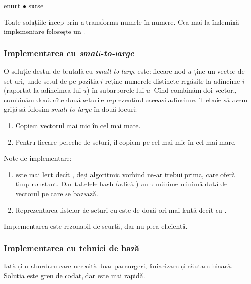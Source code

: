 \documentclass[../main.tex]{subfiles}
\begin{document}
\href{https://codeforces.com/contest/246/problem/E}{enunț}
$\bullet$
\hyperref[code:blood-cousins-return]{surse}

Toate soluțiile încep prin a transforma numele în numere. Cea mai la îndemînă implementare folosește un .

\subsubsection*{Implementarea cu \textit{small-to-large}}

O soluție destul de brutală cu \textit{small-to-large} este: fiecare nod $u$ ține un vector de set-uri, unde setul de pe poziția $i$ reține numerele distincte regăsite la adîncime $i$ (raportat la adîncimea lui $u$) în subarborele lui $u$. Cînd combinăm doi vectori, combinăm două cîte două seturile reprezentînd aceeași adîncime. Trebuie să avem grijă să folosim \textit{small-to-large} în două locuri:

\begin{enumerate}
  \item Copiem vectorul mai mic în cel mai mare.
  \item Pentru fiecare pereche de seturi, îl copiem pe cel mai mic în cel mai mare.
\end{enumerate}

Note de implementare:

\begin{enumerate}
  \item {} este mai lent decît , deși algoritmic vorbind ne-ar trebui prima, care oferă timp constant. Dar tabelele hash (adică ) au o mărime minimă dată de vectorul pe care se bazează.

  \item Reprezentarea listelor de seturi cu  este de două ori mai lentă decît cu .
\end{enumerate}

Implementarea este rezonabil de scurtă, dar nu prea eficientă.

\subsubsection*{Implementarea cu tehnici de bază}

Iată și o abordare care necesită doar parcurgeri, liniarizare și căutare binară. Soluția este greu de codat, dar este mai rapidă.
\end{document}
